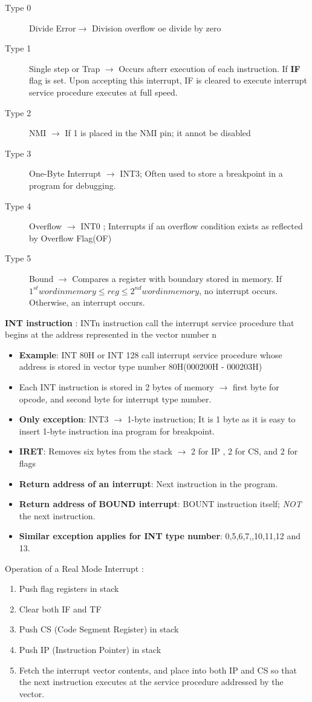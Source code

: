 \begin{description}
  \item[Type 0] Divide Error$\longrightarrow$ Division overflow oe divide by zero
  \item[Type 1] Single step or Trap $\longrightarrow$ Occurs afterr execution of each instruction. If \textbf{IF} flag is set. Upon accepting this interrupt, IF is cleared to execute interrupt service procedure executes at full speed.
  \item[Type 2] NMI $\longrightarrow$ If 1 is placed in the NMI pin; it annot be disabled
  \item[Type 3] One-Byte Interrupt $\longrightarrow$ INT3; Often used to store a breakpoint in a program for debugging.
  \item[Type 4] Overflow $\longrightarrow$ INT0 ; Interrupts if an overflow condition exists as reflected by Overflow Flag(OF)
  \item[Type 5] Bound $\longrightarrow$ Compares a register with boundary stored in memory. If $1^{st} word in memory \leq reg\leq 2^{nd} word in memory$, no interrupt occurs. Otherwise, an interrupt occurs.
\end{description}
\textbf{INT instruction} : INTn instruction call the interrupt service procedure that begins at the address represented in the vector number n
\begin{itemize}
  \item \textbf{Example}: INT 80H or INT 128 call interrupt service procedure whose address is stored in vector type number 80H(000200H - 000203H)
  \item Each INT instruction is stored in 2 bytes of memory $\longrightarrow$ first byte for opcode, and second byte for interrupt type number.
  \item \textbf{Only exception}: INT3 $\longrightarrow$ 1-byte instruction;  It is 1 byte as it is easy to insert 1-byte instruction ina program for breakpoint.
  \item \textbf{IRET}: Removes six bytes from the stack $\longrightarrow$ 2 for IP , 2 for CS, and 2 for flags
  \item \textbf{Return address of an interrupt}: Next instruction in the program.
  \item \textbf{Return address of BOUND interrupt}: BOUNT instruction itself; \textit{NOT} the next instruction.
  \item \textbf{Similar exception applies for INT type number}: 0,5,6,7,,10,11,12 and 13.

\end{itemize}
Operation of a Real Mode Interrupt :
\begin{enumerate}
  \item Push flag registers in stack
  \item Clear both IF and TF
  \item Push CS (Code Segment Register) in stack
  \item Push IP (Instruction Pointer) in stack
  \item Fetch the interrupt vector contents, and place into both IP and CS so that the next instruction executes at the service procedure addressed by the vector.
\end{enumerate}

